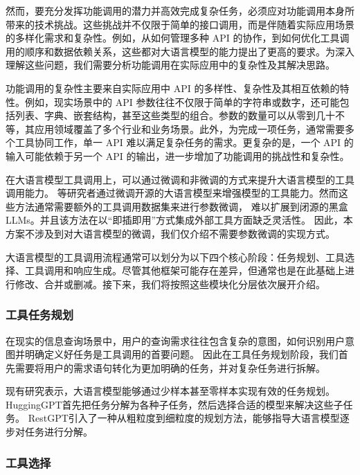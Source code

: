 然而，要充分发挥功能调用的潜力并高效完成复杂任务，必须应对功能调用本身所带来的技术挑战。这些挑战并不仅限于简单的接口调用，而是伴随着实际应用场景的多样化需求和复杂性。例如，从如何管理多种 API 的协作，到如何优化工具调用的顺序和数据依赖关系，这些都对大语言模型的能力提出了更高的要求\cite{huang2024planning, Qin2023}。为深入理解这些问题，我们需要分析功能调用在实际应用中的复杂性及其解决思路。

功能调用的复杂性主要来自实际应用中 API 的多样性、复杂性及其相互依赖的特性\cite{Qin2023}。例如，现实场景中的 API 参数往往不仅限于简单的字符串或数字，还可能包括列表、字典、嵌套结构，甚至这些类型的组合。参数的数量可以从零到几十不等，其应用领域覆盖了多个行业和业务场景\cite{ye2024tooleyes}。此外，为完成一项任务，通常需要多个工具协同工作，单一 API 难以满足复杂任务的需求\cite{huang2024planning}。更复杂的是，一个 API 的输入可能依赖于另一个 API 的输出\cite{Qin2023}，进一步增加了功能调用的挑战性和复杂性。

在大语言模型工具调用上，可以通过微调和非微调的方式来提升大语言模型的工具调用能力。
\cite{Qin2023, schick2024toolformer, hao2024toolkengpt, parisi2022talm}等研究者通过微调开源的大语言模型来增强模型的工具能力。然而这些方法通常需要额外的工具调用数据集来进行参数微调，
难以扩展到闭源的黑盒LLMs。并且该方法在以“即插即用”方式集成外部工具方面缺乏灵活性。
因此，本方案不涉及到对大语言模型的微调，我们仅介绍不需要参数微调的实现方式。

大语言模型的工具调用流程通常可以划分为以下四个核心阶段\cite{Ruan2023, Shen2023, Song2023}：任务规划、工具选择、工具调用和响应生成。尽管其他框架可能存在差异，但通常也是在此基础上进行修改、合并或删减。接下来，我们将按照这些模块化分层依次展开介绍。

\subsubsection{工具任务规划}

在现实的信息查询场景中，用户的查询需求往往包含复杂的意图，如何识别用户意图并明确定义好任务是工具调用的首要问题。
因此在工具任务规划阶段，我们首先需要将用户的需求语句转化为更加明确的任务，并对复杂任务进行拆解。

现有研究\cite{Miao2023}表示，大语言模型能够通过少样本甚至零样本实现有效的任务规划。
HuggingGPT\cite{Shen2023}首先把任务分解为各种子任务，然后选择合适的模型来解决这些子任务。
RestGPT\cite{Song2023}引入了一种从粗粒度到细粒度的规划方法，能够指导大语言模型逐步对任务进行分解。

\subsubsection{工具选择}

